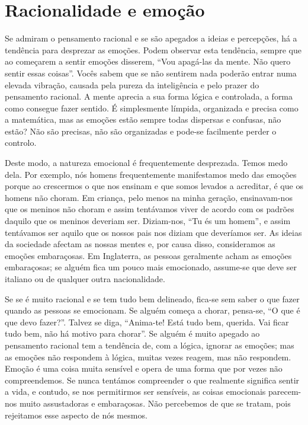 \section{Racionalidade e emoção}

Se admiram o pensamento racional e se são apegados a ideias e percepções, há a
tendência para desprezar as emoções. Podem observar esta tendência, sempre que
ao começarem a sentir emoções disserem, “Vou apagá-las da mente. Não quero
sentir essas coisas”. Vocês sabem que se não sentirem nada poderão entrar numa
elevada vibração, causada pela pureza da inteligência e pelo prazer do
pensamento racional. A mente aprecia a sua forma lógica e controlada, a forma
como consegue fazer sentido. É simplesmente límpida, organizada e precisa como a
matemática, mas as emoções estão sempre todas dispersas e confusas, não estão?
Não são precisas, não são organizadas e pode-se facilmente perder o controlo.

Deste modo, a natureza emocional é frequentemente desprezada. Temos medo dela.
Por exemplo, nós homens frequentemente manifestamos medo das emoções porque ao
crescermos o que nos ensinam e que somos levados a acreditar, é que os homens
não choram. Em criança, pelo menos na minha geração, ensinavam-nos que os
meninos não choram e assim tentávamos viver de acordo com os padrões daquilo que
os meninos deveriam ser. Diziam-nos, “Tu és um homem”, e assim tentávamos ser
aquilo que os nossos pais nos diziam que deveríamos ser. As ideias da sociedade
afectam as nossas mentes e, por causa disso, consideramos as emoções
embaraçosas. Em Inglaterra, as pessoas geralmente acham as emoções embaraçosas;
se alguém fica um pouco mais emocionado, assume-se que deve ser italiano ou de
qualquer outra nacionalidade.

Se se é muito racional e se tem tudo bem delineado, fica-se sem saber o que
fazer quando as pessoas se emocionam. Se alguém começa a chorar, pensa-se, “O
que é que devo fazer?”. Talvez se diga, “Anima-te! Está tudo bem, querida. Vai
ficar tudo bem, não há motivo para chorar”. Se alguém é muito apegado ao
pensamento racional tem a tendência de, com a lógica, ignorar as emoções; mas as
emoções não respondem à lógica, muitas vezes reagem, mas não respondem. Emoção é
uma coisa muita sensível e opera de uma forma que por vezes não compreendemos.
Se nunca tentámos compreender o que realmente significa sentir a vida, e
contudo, se nos permitirmos ser sensíveis, as coisas emocionais parecem-nos
muito assustadoras e embaraçosas. Não percebemos de que se tratam, pois
rejeitamos esse aspecto de nós mesmos.

